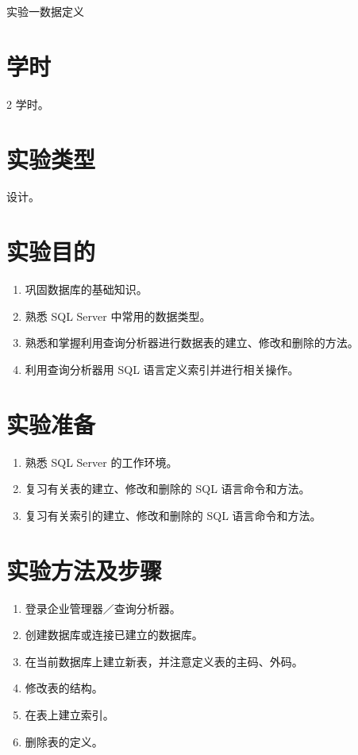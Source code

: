 \documentclass{sjkyljyyexp}
\begin{document}
\makecover
\cqutBeginReportBody
\begin{center}
  {\heiti{} 实验一\quad 数据定义}
\end{center}

\section{学时}
2 学时。

\section{实验类型}
设计。

\section{实验目的}
\begin{enumerate}
  \item 巩固数据库的基础知识。
  \item 熟悉 SQL Server 中常用的数据类型。
  \item 熟悉和掌握利用查询分析器进行数据表的建立、修改和删除的方法。
  \item 利用查询分析器用 SQL 语言定义索引并进行相关操作。
\end{enumerate}

\section{实验准备}
\begin{enumerate}
  \item 熟悉 SQL Server 的工作环境。
  \item 复习有关表的建立、修改和删除的 SQL 语言命令和方法。
  \item 复习有关索引的建立、修改和删除的 SQL 语言命令和方法。
\end{enumerate}

\section{实验方法及步骤}
\begin{enumerate}
  \item 登录企业管理器／查询分析器。
  \item 创建数据库或连接已建立的数据库。
  \item 在当前数据库上建立新表，并注意定义表的主码、外码。
  \item 修改表的结构。
  \item 在表上建立索引。
  \item 删除表的定义。
\end{enumerate}
\end{document}
